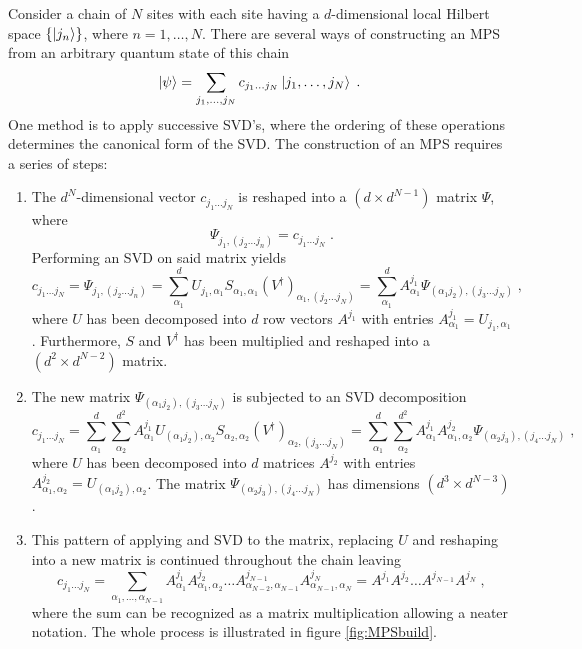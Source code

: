 Consider a chain of $N$ sites with each site having a $d$-dimensional local Hilbert space $\{ \ket{j_n} \}$, where $n = 1, \ldots, N$. There are several ways of constructing an MPS from an arbitrary quantum state of this chain
\begin{equation}
	\ket{\psi} = \sum_{j_1, \ldots, j_N} c_{j_1 \ldots j_N} \ket{j_1, \ldots, j_N} \; .
	\label{eq:arbstate}
\end{equation}
One method is to apply successive SVD's, where the ordering of these operations determines the canonical form of the SVD. The construction of an MPS requires a series of steps:
\begin{enumerate}
\item
The $d^N$-dimensional vector $c_{j_1 \ldots j_N}$ is reshaped into a $(d \times d^{N-1})$ matrix $\Psi$, where
\begin{equation}
	\Psi_{j_1 , (j_2 \ldots j_n)} = c_{j_1 \ldots j_N} \; .
\end{equation}
Performing an SVD on said matrix yields
\begin{equation}
	c_{j_1 \ldots j_N} = \Psi_{j_1 , (j_2 \ldots j_n)} = \sum_{\alpha_1}^{d} U_{j_1 , \alpha_1} S_{\alpha_1 , \alpha_1} (V^{\dag})_{\alpha_1 , (j_2 \ldots j_N)} = \sum_{\alpha_1}^{d} A_{\alpha_1}^{j_1} \Psi_{(\alpha_1 j_2),(j_3 \ldots j_N)} \; ,
\end{equation}
where $U$ has been decomposed into $d$ row vectors $A^{j_1}$ with entries $A_{\alpha_1}^{j_1} = U_{j_1 , \alpha_1}$. Furthermore, $S$ and $V^{\dag}$ has been multiplied and reshaped into a $(d^2 \times d^{N-2})$ matrix.

\item
The new matrix $\Psi_{(\alpha_1 j_2),(j_3 \ldots j_N)}$ is subjected to an SVD decomposition
\begin{equation}
	c_{j_1 \ldots j_N} = \sum_{\alpha_1}^{d} \sum_{\alpha_2}^{d^2} A_{\alpha_1}^{j_1} U_{(\alpha_1 j_2) , \alpha_2} S_{\alpha_2 , \alpha_2} (V^{\dag})_{\alpha_2 , (j_3 \ldots j_N)} = \sum_{\alpha_1}^{d} \sum_{\alpha_2}^{d^2} A_{\alpha_1}^{j_1} A_{\alpha_1 , \alpha_2}^{j_2} \Psi_{(\alpha_2 j_3),(j_4 \ldots j_N)} \; ,
\end{equation}
where $U$ has been decomposed into $d$ matrices $A^{j_2}$ with entries $A_{\alpha_1 , \alpha_2}^{j_2} = U_{(\alpha_1 j_2) , \alpha_2}$. The matrix $\Psi_{(\alpha_2 j_3),(j_4 \ldots j_N)}$ has dimensions $(d^3 \times d^{N-3})$.

\item
This pattern of applying and SVD to the matrix, replacing $U$ and reshaping into a new matrix is continued throughout the chain leaving 
\begin{equation}
	c_{j_1 \ldots j_N} = \sum_{\alpha_1 , \ldots , \alpha_{N-1}} A_{\alpha_1}^{j_1} A_{\alpha_1 , \alpha_2}^{j_2} \ldots A_{\alpha_{N-2} ,\alpha_{N-1}}^{j_{N-1}} A_{\alpha_{N-1} ,\alpha_{N}}^{j_{N}} = A^{j_1} A^{j_2} \ldots A^{j_{N-1}} A^{j_{N}} \; ,
\end{equation}
where the sum can be recognized as a matrix multiplication allowing a neater notation. The whole process is illustrated in figure \ref{fig:MPSbuild}.

\end{enumerate}

